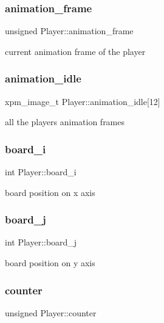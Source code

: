\subsubsection{\texorpdfstring{animation\+\_\+frame}{animation\_frame}}
{\footnotesize\ttfamily unsigned Player\+::animation\+\_\+frame}

current animation frame of the player \mbox{\label{structPlayer_a6b9abb8c8a4d3f6ee07fe89294d8b24b}} 
\subsubsection{\texorpdfstring{animation\+\_\+idle}{animation\_idle}}
{\footnotesize\ttfamily xpm\+\_\+image\+\_\+t Player\+::animation\+\_\+idle\mbox{[}12\mbox{]}}

all the player\textquotesingle{}s animation frames \mbox{\label{structPlayer_a9b9db456166f97a2bb620919b23aa91b}} 
\subsubsection{\texorpdfstring{board\+\_\+i}{board\_i}}
{\footnotesize\ttfamily int Player\+::board\+\_\+i}

board position on x axis \mbox{\label{structPlayer_a17156154173c98e7736dc6c6d26056c9}} 
\subsubsection{\texorpdfstring{board\+\_\+j}{board\_j}}
{\footnotesize\ttfamily int Player\+::board\+\_\+j}

board position on y axis \mbox{\label{structPlayer_a96997d7fd96cd075a5461f388b70e411}} 
\subsubsection{\texorpdfstring{counter}{counter}}
{\footnotesize\ttfamily unsigned Player\+::counter}


